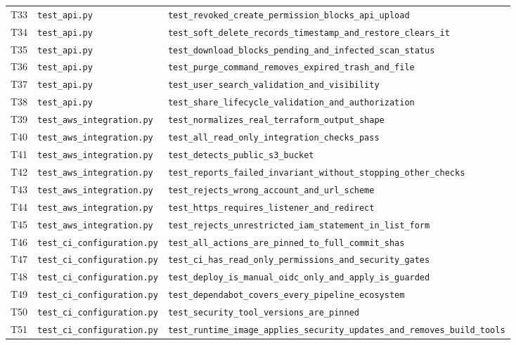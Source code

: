 {\begin{longtable}{P{.8cm}P{4cm}P{8cm}}
T33 & \nolinkurl{test_api.py} & \nolinkurl{test_revoked_create_permission_blocks_api_upload} \\
T34 & \nolinkurl{test_api.py} & \nolinkurl{test_soft_delete_records_timestamp_and_restore_clears_it} \\
T35 & \nolinkurl{test_api.py} & \nolinkurl{test_download_blocks_pending_and_infected_scan_status} \\
T36 & \nolinkurl{test_api.py} & \nolinkurl{test_purge_command_removes_expired_trash_and_file} \\
T37 & \nolinkurl{test_api.py} & \nolinkurl{test_user_search_validation_and_visibility} \\
T38 & \nolinkurl{test_api.py} & \nolinkurl{test_share_lifecycle_validation_and_authorization} \\
T39 & \nolinkurl{test_aws_integration.py} & \nolinkurl{test_normalizes_real_terraform_output_shape} \\
T40 & \nolinkurl{test_aws_integration.py} & \nolinkurl{test_all_read_only_integration_checks_pass} \\
T41 & \nolinkurl{test_aws_integration.py} & \nolinkurl{test_detects_public_s3_bucket} \\
T42 & \nolinkurl{test_aws_integration.py} & \nolinkurl{test_reports_failed_invariant_without_stopping_other_checks} \\
T43 & \nolinkurl{test_aws_integration.py} & \nolinkurl{test_rejects_wrong_account_and_url_scheme} \\
T44 & \nolinkurl{test_aws_integration.py} & \nolinkurl{test_https_requires_listener_and_redirect} \\
T45 & \nolinkurl{test_aws_integration.py} & \nolinkurl{test_rejects_unrestricted_iam_statement_in_list_form} \\
T46 & \nolinkurl{test_ci_configuration.py} & \nolinkurl{test_all_actions_are_pinned_to_full_commit_shas} \\
T47 & \nolinkurl{test_ci_configuration.py} & \nolinkurl{test_ci_has_read_only_permissions_and_security_gates} \\
T48 & \nolinkurl{test_ci_configuration.py} & \nolinkurl{test_deploy_is_manual_oidc_only_and_apply_is_guarded} \\
T49 & \nolinkurl{test_ci_configuration.py} & \nolinkurl{test_dependabot_covers_every_pipeline_ecosystem} \\
T50 & \nolinkurl{test_ci_configuration.py} & \nolinkurl{test_security_tool_versions_are_pinned} \\
T51 & \nolinkurl{test_ci_configuration.py} & \nolinkurl{test_runtime_image_applies_security_updates_and_removes_build_tools} \\

\end{longtable}}
